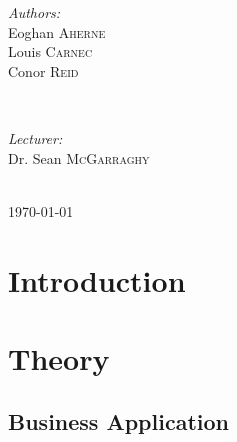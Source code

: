 \documentclass[paper=a4, fontsize=10pt]{scrartcl} %
\begin{document}
\begin{titlepage}
\begin{minipage}{0.4\textwidth}
\begin{flushleft} \large
\emph{Authors:}\\
\small{Eoghan \textsc{Aherne}}\\
\small{Louis \textsc{Carnec}}\\
\small{Conor \textsc{Reid}} %
\end{flushleft}
\end{minipage}
~
\begin{minipage}{0.4\textwidth}
\begin{flushright} \large
\emph{Lecturer:} \\
\small{Dr. Sean \textsc{McGarraghy}} %
\end{flushright}
\end{minipage}\\[4cm]


\vspace{3cm}
{\large \today}\\[1cm] %

\vfill %

\end{titlepage}

\tableofcontents
\clearpage
\onecolumn
\section{Introduction}
\clearpage
\section{Theory}
\subsection {Business Application}
\end{document}
